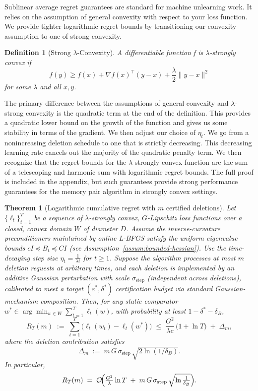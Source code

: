 \documentclass{article}
\theoremstyle{ssltheorem}
\newtheorem{theorem}{Theorem}
\newtheorem{definition}{Definition}
\begin{document}
Sublinear average regret guarantees are standard for machine unlearning work.
It relies on the assumption of general convexity with respect to your loss function.
We provide tighter logarithmic regret bounds by transitioning our convexity assumption to one of strong convexity.
\begin{definition}[Strong $\lambda$-Convexity]
    A differentiable function f is $\lambda$-strongly convex if 
    $$
    f(y) \geq f(x) + \nabla f(x)^{\top}(y-x)+ \frac{\lambda}{2}\|y-x\|^{2}
    $$
    for some $\lambda$ and all $x,y$.
\end{definition}

The primary difference between the assumptions of general convexity and $\lambda$-strong convexity is the quadratic term at the end of the definition.
This provides a quadratic lower bound on the growth of the function and gives us some stability in terms of the gradient.
We then adjust our choice of $\eta_{t}$. We go from a nonincreasing deletion schedule to one that is strictly decreasing.
This decreasing learning rate cancels out the majority of the quadratic penalty term.
We then recognize that the regret bounds for the $\lambda$-strongly convex function are the sum of a telescoping and harmonic sum with logarithmic regret bounds.
The full proof is included in the appendix, but such guarantees provide strong performance guarantees for the memory pair algorithm in strongly convex settings.
\begin{theorem}[Logarithmic cumulative regret with $m$ certified deletions]
\label{thm:log_regret}
Let $\{\ell_{t}\}_{t=1}^T$ be a sequence of $\lambda$-strongly convex, $G$-Lipschitz loss functions over a closed, convex domain $W$ of diameter $D$.
Assume the inverse-curvature preconditioners maintained by online \mbox{L-BFGS} satisfy the uniform eigenvalue bounds $cI \preceq B_{t} \preceq CI$ (see Assumption~\ref{assum:bounded-hessian}).
Use the time-decaying step size $\eta_{t}=\frac{1}{\lambda t}$ for $t\ge 1$.
Suppose the algorithm processes at most $m$ deletion requests at arbitrary times, and each deletion is implemented by an additive Gaussian perturbation with scale $\sigma_{\text{step}}$ (independent across deletions), calibrated to meet a target $(\varepsilon^{*},\delta^{*})$ certification budget via standard Gaussian-mechanism composition.
Then, for any static comparator $w^{*}\in\arg\min_{w\in W}\sum_{t=1}^T \ell_{t}(w)$, with probability at least $1-\delta^{*}-\delta_{B}$,
\[
R_{T}(m)\;:=\;\sum_{t=1}^{T}\bigl(\ell_{t}(w_{t})-\ell_{t}(w^{*})\bigr)
\;\le\;
\frac{G^{2}}{\lambda c}\,\bigl(1+\ln T\bigr)\;+\;\Delta_{m},
\]
where the deletion contribution satisfies
\[
\Delta_{m} \;:=\; m\,G\,\sigma_{\text{step}}\,\sqrt{2\ln(1/\delta_{B})}.
\]
In particular,
\[
R_{T}(m)\;=\;\mathcal{O}\!\Bigl(\tfrac{G^{2}}{\lambda}\ln T\;+\;m\,G\,\sigma_{\text{step}}\,\sqrt{\ln\tfrac{1}{\delta_{B}}}\Bigr).
\]
\end{theorem}
\end{document}
